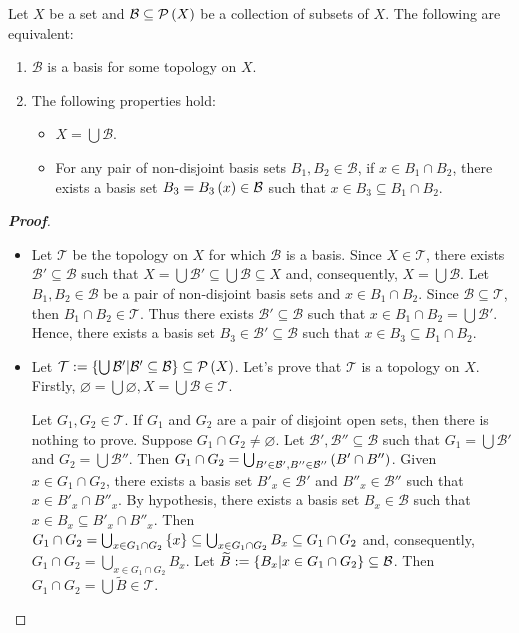\begin{proposition}
  Let $X$ be a set and $\mathcal{B}\subseteq\mathcal{P}\left(X\right)$ be a collection of subsets of $X$. The following are equivalent:

  \begin{enumerate}
    \item $\mathcal{B}$ is a basis for some topology on $X$.
    \item The following properties hold:
    \begin{itemize}
      \item[(i)] $X=\bigcup{\mathcal{B}}$.
      \item[(ii)] For any pair of non-disjoint basis sets $B_1,B_2\in\mathcal{B}$, if $x\in B_1\cap B_2$, there exists a basis set $B_3=B_3\left(x\right)\in\mathcal{B}$ such that $x\in B_3\subseteq B_1\cap B_2$.
    \end{itemize}
  \end{enumerate}
  \begin{proof}[\rm\textbf{Proof}]
    \hfill
    \begin{itemize}
      \item[\boxed{1\Rightarrow2}] Let $\mathcal{T}$ be the topology on $X$ for which $\mathcal{B}$ is a basis. Since $X\in\mathcal{T}$, there exists $\mathcal{B}'\subseteq\mathcal{B}$ such that $X=\bigcup{\mathcal{B}'}\subseteq\bigcup{\mathcal{B}}\subseteq X$ and, consequently, $X=\bigcup{\mathcal{B}}$. Let $B_1,B_2\in\mathcal{B}$ be a pair of non-disjoint basis sets and $x\in B_1\cap B_2$. Since $\mathcal{B}\subseteq\mathcal{T}$, then $B_1\cap B_2\in\mathcal{T}$. Thus there exists $\mathcal{B}'\subseteq\mathcal{B}$ such that $x\in B_1\cap B_2=\bigcup{\mathcal{B}'}$. Hence, there exists a basis set $B_3\in\mathcal{B}'\subseteq\mathcal{B}$ such that $x\in B_3\subseteq B_1\cap B_2$.
      \item[\boxed{2\Rightarrow1}] Let $\mathcal{T}:=\left\{\bigcup{\mathcal{B}'}\middle|\mathcal{B}'\subseteq\mathcal{B}\right\}\subseteq\mathcal{P}\left(X\right)$. Let's prove that $\mathcal{T}$ is a topology on $X$. Firstly, $\varnothing=\bigcup{\varnothing},X=\bigcup{\mathcal{B}}\in\mathcal{T}$. 
      
      Let $G_1,G_2\in\mathcal{T}$. If $G_1$ and $G_2$ are a pair of disjoint open sets, then there is nothing to prove. Suppose $G_1\cap G_2\neq\varnothing$. Let $\mathcal{B}',\mathcal{B}''\subseteq\mathcal{B}$ such that $G_1=\bigcup{\mathcal{B}'}$ and $G_2=\bigcup{\mathcal{B}''}$. Then $G_1\cap G_2=\bigcup_{B'\in\mathcal{B}',B''\in\mathcal{B}''}{\left(B'\cap B''\right)}$. Given $x\in G_1\cap G_2$, there exists a basis set $B'_x\in\mathcal{B}'$ and $B''_x\in\mathcal{B}''$ such that $x\in B'_x\cap B''_x$. By hypothesis, there exists a basis set $B_x\in\mathcal{B}$ such that $x\in B_x\subseteq B'_x\cap B''_x$. Then $G_1\cap G_2=\bigcup_{x\in G_1\cap G_2}{\left\{x\right\}}\subseteq\bigcup_{x\in G_1\cap G_2}{B_x}\subseteq G_1\cap G_2$ and, consequently, $G_1\cap G_2=\bigcup_{x\in G_1\cap G_2}{B_x}$. Let $\widetilde{B}:=\left\{B_x\middle|x\in G_1\cap G_2\right\}\subseteq\mathcal{B}$. Then $G_1\cap G_2=\bigcup{\widetilde{B}}\in\mathcal{T}$. 


\end{itemize}
\end{proof}
\end{proposition}
